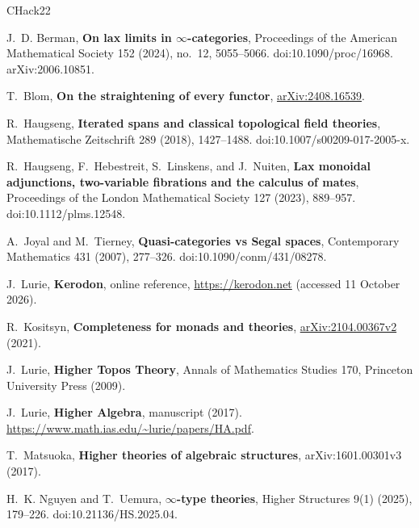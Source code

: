 \documentclass[oneside]{article}
\theoremstyle{plain}
\theoremstyle{definition}
\theoremstyle{remark}
\begin{document}
\begin{thebibliography}{CHack22}
\raggedright
J.~D. Berman, \textbf{On lax limits in $\infty$-categories},
Proceedings of the American Mathematical Society 152 (2024), no.~12,
5055--5066. doi:10.1090/proc/16968. arXiv:2006.10851.

T.~Blom, \textbf{On the straightening of every functor},
\href{https://arxiv.org/abs/2408.16539}{arXiv:2408.16539}.

R.~Haugseng, \textbf{Iterated spans and classical topological field theories},
Mathematische Zeitschrift 289 (2018), 1427--1488.
doi:10.1007/s00209-017-2005-x.

R.~Haugseng, F.~Hebestreit, S.~Linskens, and J.~Nuiten,
\textbf{Lax monoidal adjunctions, two-variable fibrations and the calculus
of mates}, Proceedings of the London Mathematical Society
127 (2023), 889--957. doi:10.1112/plms.12548.

A.~Joyal and M.~Tierney, \textbf{Quasi-categories vs Segal spaces},
Contemporary Mathematics 431 (2007), 277--326.
doi:10.1090/conm/431/08278.

J.~Lurie, \textbf{Kerodon}, online reference, \url{https://kerodon.net}
(accessed 11 October 2026).

R.~Kositsyn, \textbf{Completeness for monads and theories},
\href{https://arxiv.org/abs/2104.00367}{arXiv:2104.00367v2} (2021).

J.~Lurie, \textbf{Higher Topos Theory}, Annals of Mathematics Studies
170, Princeton University Press (2009).

J.~Lurie, \textbf{Higher Algebra}, manuscript (2017).
\url{https://www.math.ias.edu/~lurie/papers/HA.pdf}.

T.~Matsuoka, \textbf{Higher theories of algebraic structures},
arXiv:1601.00301v3 (2017).

H.~K. Nguyen and T.~Uemura, \textbf{$\infty$-type theories},
Higher Structures 9(1) (2025), 179--226.
doi:10.21136/HS.2025.04.

\end{thebibliography}
\end{document}
